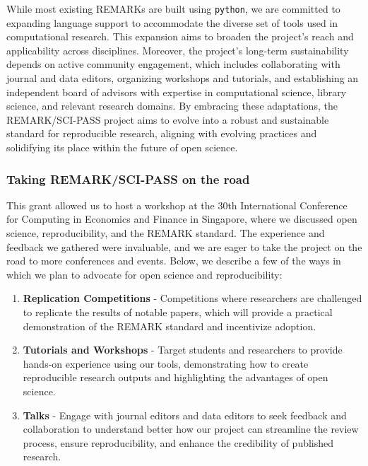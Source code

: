 \documentclass{article}
\begin{document}
While most existing REMARKs are built using \texttt{python}, we are committed to expanding language support to accommodate the diverse set of tools used in computational research. This expansion aims to broaden the project's reach and applicability across disciplines. Moreover, the project's long-term sustainability depends on active community engagement, which includes collaborating with journal and data editors, organizing workshops and tutorials, and establishing an independent board of advisors with expertise in computational science, library science, and relevant research domains. By embracing these adaptations, the REMARK/SCI-PASS project aims to evolve into a robust and sustainable standard for reproducible research, aligning with evolving practices and solidifying its place within the future of open science.

\subsubsection{Taking REMARK/SCI-PASS on the road}

This grant allowed us to host a workshop at the 30th International Conference for Computing in Economics and Finance in Singapore, where we discussed open science, reproducibility, and the REMARK standard. The experience and feedback we gathered were invaluable, and we are eager to take the project on the road to more conferences and events. Below, we describe a few of the ways in which we plan to advocate for open science and reproducibility:

\begin{enumerate}
\item \textbf{Replication Competitions} - Competitions where researchers are challenged to replicate the results of notable papers, which will provide a practical demonstration of the REMARK standard and incentivize adoption.
\item \textbf{Tutorials and Workshops} - Target students and researchers to provide hands-on experience using our tools, demonstrating how to create reproducible research outputs and highlighting the advantages of open science.
\item \textbf{Talks} - Engage with journal editors and data editors to seek feedback and collaboration to understand better how our project can streamline the review process, ensure reproducibility, and enhance the credibility of published research.
\end{enumerate}

\end{document}
